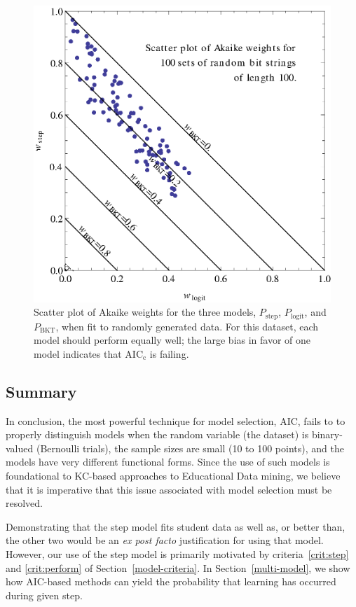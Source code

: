 \documentclass{acmlarge-edm}
\begin{document}
\begin{figure}
  \centering \includegraphics{scatter-random-weights.eps}
  \caption{Scatter plot of Akaike weights for the three models, 
   $P_\mathrm{step}$, $P_\mathrm{logit}$, and $P_\mathrm{BKT}$, 
   when fit to randomly generated data.  For this dataset, each 
   model should perform
   equally well; the large bias in favor of one model indicates
   that  AIC$_\mathrm{c}$ is failing.}\label{scatter2}
\end{figure}

\subsection{Summary}

In conclusion, the most powerful technique for model selection,
AIC, fails to to properly distinguish models when the random
variable (the dataset) is binary-valued (Bernoulli trials),
the sample sizes are small (10 to 100 points), and the models
have very different functional forms.  Since the use of such
models is foundational to KC-based approaches to Educational
Data mining, we believe that it is imperative that this issue 
associated with model selection must be resolved.

Demonstrating that the step model fits student data as well as,
or better than, the other two would be an
{\em ex post facto} justification for using that model.  
However, our use of the step model is primarily motivated
by criteria~\ref{crit:step} and \ref{crit:perform} of 
Section~\ref{model-criteria}.
In Section~\ref{multi-model}, we show how AIC-based methods
can yield the probability that learning has occurred during given step.
\end{document}

